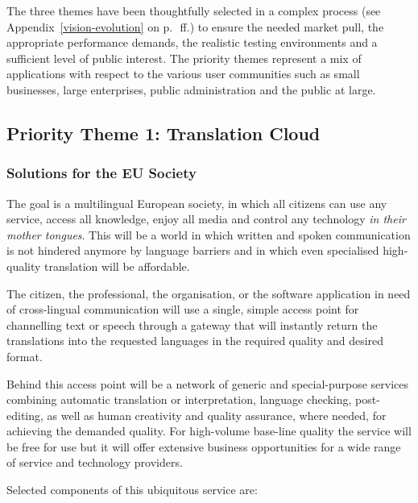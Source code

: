 \documentclass[10pt, plain]{../../metanetpaper}
\begin{document}
\begin{multicols}{2}
The three themes have been thoughtfully selected in a complex process (see Appendix~\ref{vision-evolution} on p.~\pageref{vision-evolution}\,ff.) to ensure the needed market pull, the appropriate performance demands, the realistic testing environments and a sufficient level of public interest. The priority themes represent a mix of applications with respect to the various user communities such as small businesses, large enterprises, public administration and the public at large.

\subsection{Priority Theme 1: Translation Cloud}
\label{sec:priority-theme-1-translation-cloud}

\subsubsection{Solutions for the EU Society}
\label{sec:solutions-eu-society-pt1}

The goal is a multilingual European society, in which all citizens can use any service, access all knowledge, enjoy all media and control any technology \emph{in their mother tongues}. This will be a world in which written and spoken communication is not hindered anymore by language barriers and in which even specialised high-quality translation will be affordable.
 
The citizen, the professional, the organisation, or the software application in need of cross-lingual communication will use a single, simple access point for channelling text or speech through a gateway that will instantly return the translations into the requested languages in the required quality and desired format.
 
Behind this access point will be a network of generic and special-purpose services combining automatic translation or interpretation, language checking, post-editing, as well as human creativity and quality assurance, where needed, for achieving the demanded quality. For high-volume base-line quality the service will be free for use but it will offer extensive business opportunities for a wide range of service and technology providers.

Selected components of this ubiquitous service are:


\end{multicols}
\end{document}
